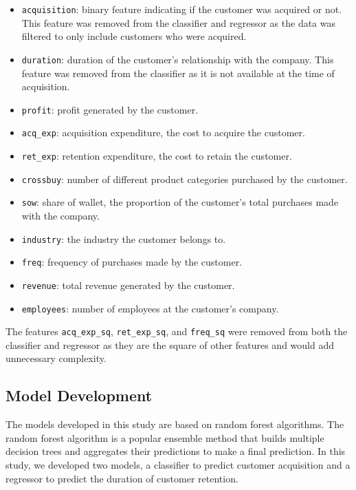 \begin{itemize}
\tightlist
\item
  \texttt{acquisition}: binary feature indicating if the customer was
  acquired or not. This feature was removed from the classifier and
  regressor as the data was filtered to only include customers who were
  acquired.
\item
  \texttt{duration}: duration of the customer's relationship with the
  company. This feature was removed from the classifier as it is not
  available at the time of acquisition.
\item
  \texttt{profit}: profit generated by the customer.
\item
  \texttt{acq\_exp}: acquisition expenditure, the cost to acquire the
  customer.
\item
  \texttt{ret\_exp}: retention expenditure, the cost to retain the
  customer.
\item
  \texttt{crossbuy}: number of different product categories purchased by
  the customer.
\item
  \texttt{sow}: share of wallet, the proportion of the customer's total
  purchases made with the company.
\item
  \texttt{industry}: the industry the customer belongs to.
\item
  \texttt{freq}: frequency of purchases made by the customer.
\item
  \texttt{revenue}: total revenue generated by the customer.
\item
  \texttt{employees}: number of employees at the customer's company.
\end{itemize}

The features \texttt{acq\_exp\_sq}, \texttt{ret\_exp\_sq}, and
\texttt{freq\_sq} were removed from both the classifier and regressor as
they are the square of other features and would add unnecessary
complexity.

\hypertarget{model-development}{%
\subsection{Model Development}\label{model-development}}

The models developed in this study are based on random forest
algorithms. The random forest algorithm is a popular ensemble method
that builds multiple decision trees and aggregates their predictions to
make a final prediction. In this study, we developed two models, a
classifier to predict customer acquisition and a regressor to predict
the duration of customer retention.

